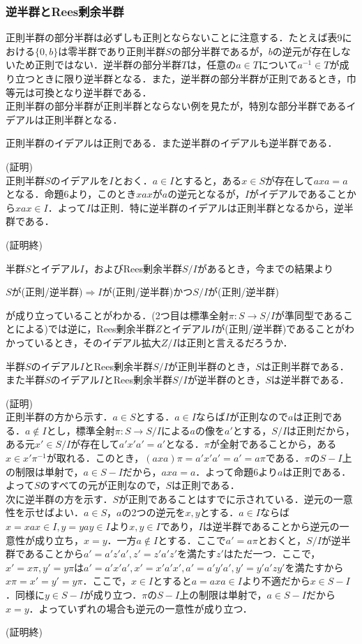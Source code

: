 \documentclass{jsarticle}
\begin{document}
\subsubsection{逆半群とRees剰余半群}
正則半群の部分半群は必ずしも正則とならないことに注意する．たとえば表9における$\{0,b\}$は零半群であり正則半群$S$の部分半群であるが，$b$の逆元が存在しないため正則ではない．逆半群の部分半群$T$は，任意の$a\in T$について$a^{-1}\in T$が成り立つときに限り逆半群となる．また，逆半群の部分半群が正則であるとき，巾等元は可換となり逆半群である．\\
正則半群の部分半群が正則半群とならない例を見たが，特別な部分半群であるイデアルは正則半群となる．
\begin{prop}
正則半群のイデアルは正則である．また逆半群のイデアルも逆半群である．
\end{prop}
(証明)\\
正則半群$S$のイデアルを$I$とおく．$a\in I$とすると，ある$x\in S$が存在して$axa=a$となる．命題6より，このとき$xax$が$a$の逆元となるが，$I$がイデアルであることから$xax\in I$．よって$I$は正則．特に逆半群のイデアルは正則半群となるから，逆半群である．
\begin{flushright}
(証明終)
\end{flushright}
半群$S$とイデアル$I$，およびRees剰余半群$S/I$があるとき，今までの結果より
\begin{center}
 $S$が(正則/逆半群)$\Rightarrow I$が(正則/逆半群)かつ$S/I$が(正則/逆半群)
\end{center}
が成り立っていることがわかる．(2つ目は標準全射$\pi:S\rightarrow S/I$が準同型であることによる)では逆に，Rees剰余半群$Z$とイデアル$I$が(正則/逆半群)であることがわかっているとき，そのイデアル拡大$Z/I$は正則と言えるだろうか．
\begin{thm}
半群$S$のイデアル$I$とRees剰余半群$S/I$が正則半群のとき，$S$は正則半群である．また半群$S$のイデアル$I$とRees剰余半群$S/I$が逆半群のとき，$S$は逆半群である．
\end{thm}
(証明)\\
正則半群の方から示す．$a\in S$とする．$a\in I$ならば$I$が正則なので$a$は正則である．$a\notin I$とし，標準全射$\pi:S\rightarrow S/I$による$a$の像を$a'$とする，$S/I$は正則だから，ある元$x'\in S/I$が存在して$a'x'a'=a'$となる．$\pi$が全射であることから，ある$x\in x'\pi^{-1}$が取れる．このとき，$(axa)\pi=a'x'a'=a'=a\pi$である．$\pi$の$S-I$上の制限は単射で，$a\in S-I$だから，$axa=a$．よって命題6より$a$は正則である．よって$S$のすべての元が正則なので，$S$は正則である．\\
次に逆半群の方を示す．$S$が正則であることはすでに示されている．逆元の一意性を示せばよい．$a\in S$，$a$の2つの逆元を$x,y$とする．$a\in I$ならば$x=xax\in I,y=yay\in I$より$x,y\in I$であり，$I$は逆半群であることから逆元の一意性が成り立ち，$x=y$．一方$a\notin I$とする．ここで$a'=a\pi$とおくと，$S/I$が逆半群であることから$a'=a'z'a', z'=z'a'z'$を満たす$z'$はただ一つ．ここで，$x'=x\pi,y'=y\pi$は$a'=a'x'a', x'=x'a'x', a'=a'y'a', y'=y'a'zy'$を満たすから$x\pi=x'=y'=y\pi$．ここで，$x\in I$とすると$a=axa\in I$より不適だから$x\in S-I$．同様に$y\in S-I$が成り立つ．$\pi$の$S-I$上の制限は単射で，$a\in S-I$だから$x=y$．よっていずれの場合も逆元の一意性が成り立つ．
\begin{flushright}
(証明終)
\end{flushright}
\end{document}
